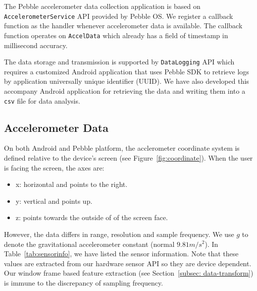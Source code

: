 The Pebble accelerometer data collection application is based on \texttt{AccelerometerService} API provided by Pebble OS. We register a callback function as the handler whenever accelerometer data is available. The callback function operates on \texttt{AccelData} which already has a field of timestamp in millisecond accuracy. 

The data storage and transmission is supported by \texttt{DataLogging} API which requires a customized Android application that uses Pebble SDK to retrieve logs by application universally unique identifier (UUID). We have also developed this accompany Android application for retrieving the data and writing them into a \texttt{csv} file for data analysis.

\subsection{Accelerometer Data}
\label{sec:accelerometer-axes}

On both Android and Pebble platform, the acclerometer coordinate system is defined relative to the device's screen (see Figure~\ref{fig:coordinate}). When the user is facing the screen, the axes are:
\begin{itemize}
\item x: horizontal and points to the right.
\item y: vertical and points up.
\item z: points towards the outside of of the screen face.
\end{itemize}

 


However, the data differs in range, resolution and sample frequency. We use $g$ to denote the gravitational accelerometer constant (normal $9.81 m/s^2$). In Table~\ref{tab:sensorinfo}, we have listed the sensor information. Note that these values are extracted from our hardware sensor API so they are device dependent. Our window frame based feature extraction (see Section~\ref{subsec: data-transform}) is immune to the discrepancy of sampling frequency.

